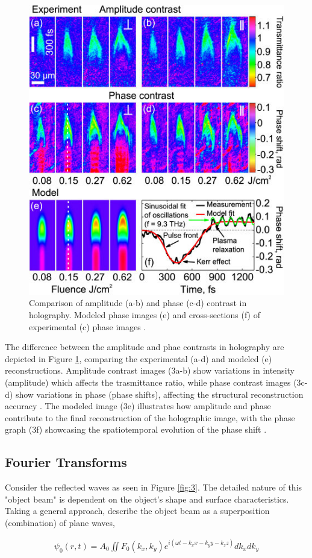 \documentclass[12pt]{article}
\begin{document}
\begin{figure}[H]
    \centering
    \includegraphics[width=.5\textwidth]{amplitude v phase contrast.jpg}
    \caption{Comparison of amplitude (a-b) and phase (c-d) contrast in holography. Modeled phase images (e) and cross-sections (f) of experimental (c) phase images \protect\cite{ampvphaseimg}.}
    \label{fig:6}
\end{figure}

The difference between the amplitude and phae contrasts in holography are depicted in Figure \ref{fig:6}, comparing the experimental (a-d) and modeled (e) reconstructions.
Amplitude contrast images (3a-b) show variations in intensity (amplitude) which affects the trasmittance ratio, while phase contrast images (3c-d) show variations in phase (phase shifts), affecting the structural reconstruction accuracy \cite{latychevskaia2009simultaneous,ampvphaseimg}.
The modeled image (3e) illustrates how amplitude and phase contribute to the final reconstruction of the holographic image, with the phase graph (3f) showcasing the spatiotemporal evolution of the phase shift \cite{ampvphaseimg}.

\subsection{Fourier Transforms} \label{sec:1.3}

Consider the reflected waves as seen in Figure \ref{fig:3}. The detailed nature of this "object beam" is dependent on the object's shape and surface
characteristics. Taking a general approach, describe the object beam as a superposition (combination) of plane waves,

\vspace{-2ex}
\begin{gather*}
    \psi_0 (r,t) = A_0 \iint F_0 (k_x,k_y) e^{i(\omega t- k_x x- k_y y - k_z z)} dk_x dk_y 
\end{gather*}
\end{document}
